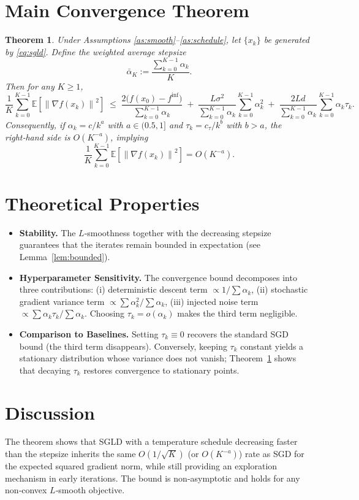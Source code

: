 \documentclass{article}
\newtheorem{theorem}{Theorem}
\newcommand{\E}{\mathbb{E}}
\newcommand{\norm}[1]{\left\|#1\right\|}
\begin{document}
\section*{Main Convergence Theorem}
\begin{theorem}\label{thm:main}
Under Assumptions \ref{as:smooth}–\ref{as:schedule}, let $\{x_{k}\}$ be generated by \eqref{eq:sgld}. Define the weighted average stepsize
\[
\bar\alpha_{K}:=\frac{\sum_{k=0}^{K-1}\alpha_{k}}{K}.
\]
Then for any $K\ge1$,
\[
\frac{1}{K}\sum_{k=0}^{K-1}\E\!\left[\norm{\nabla f(x_{k})}^{2}\right]
\;\le\;
\frac{2\bigl(f(x_{0})-f^{\inf}\bigr)}{\sum_{k=0}^{K-1}\alpha_{k}}
\;+\;
\frac{L\sigma^{2}}{\sum_{k=0}^{K-1}\alpha_{k}}\sum_{k=0}^{K-1}\alpha_{k}^{2}
\;+\;
\frac{2L d}{\sum_{k=0}^{K-1}\alpha_{k}}\sum_{k=0}^{K-1}\alpha_{k}\tau_{k}.
\tag{5}
\]
Consequently, if $\alpha_{k}=c/k^{a}$ with $a\in(0.5,1]$ and $\tau_{k}=c_{\tau}/k^{b}$ with $b>a$, the right‑hand side is $O(K^{-a})$, implying 
\[
\frac{1}{K}\sum_{k=0}^{K-1}\E\!\left[\norm{\nabla f(x_{k})}^{2}\right]=O\!\left(K^{-a}\right).
\]
\end{theorem}

\section*{Theoretical Properties}
\begin{itemize}[nosep]
\item \textbf{Stability.} The $L$‑smoothness together with the decreasing stepsize guarantees that the iterates remain bounded in expectation (see Lemma~\ref{lem:bounded}).
\item \textbf{Hyperparameter Sensitivity.} The convergence bound decomposes into three contributions: (i) deterministic descent term $\propto 1/\sum\alpha_{k}$, (ii) stochastic gradient variance term $\propto \sum\alpha_{k}^{2}/\sum\alpha_{k}$, (iii) injected noise term $\propto \sum\alpha_{k}\tau_{k}/\sum\alpha_{k}$. Choosing $\tau_{k}=o(\alpha_{k})$ makes the third term negligible.
\item \textbf{Comparison to Baselines.} Setting $\tau_{k}\equiv0$ recovers the standard SGD bound (the third term disappears). Conversely, keeping $\tau_{k}$ constant yields a stationary distribution whose variance does not vanish; Theorem~\ref{thm:main} shows that decaying $\tau_{k}$ restores convergence to stationary points.
\end{itemize}

\section*{Discussion}
The theorem shows that SGLD with a temperature schedule decreasing faster than the stepsize inherits the same $O(1/\sqrt{K})$ (or $O(K^{-a})$) rate as SGD for the expected squared gradient norm, while still providing an exploration mechanism in early iterations. The bound is non‑asymptotic and holds for any non‑convex $L$‑smooth objective.
\end{document}
